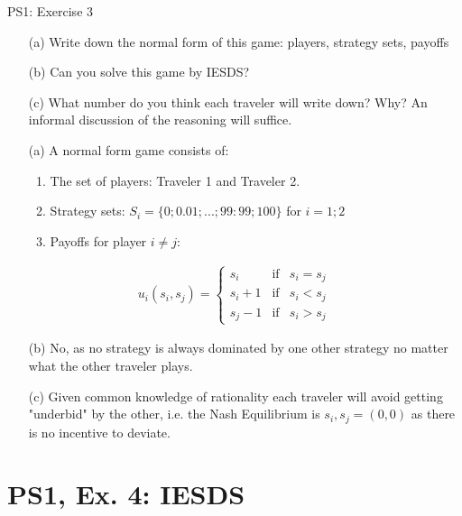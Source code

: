 \begin{frame}{PS1: Exercise 3}
\begin{multicols}{2}
  \begin{itemize}
    \item[(a)] Write down the normal form of this game: players, strategy sets, payoffs
  \item[(b)] Can you solve this game by IESDS?
  \item[(c)] What number do you think each traveler will write down? Why? An informal
  discussion of the reasoning will suffice.
  \end{itemize}
\vfill\null
\columnbreak
\begin{itemize}
  \item[(a)] A normal form game consists of:
    \begin{enumerate}
      \item The set of players: Traveler 1 and Traveler 2.
      \item Strategy sets: $S_i = \{0; 0.01; ... ; 99:99; 100\}$ for $i = 1; 2$
      \item Payoffs for player $i\neq j$:
    \end{enumerate}
\end{itemize}
\begin{align*}
  u_i(s_i,s_j)=
  \left\{ \begin{array}{ccl}
  s_i   & \mbox{if} & s_i=s_j \\
  s_i+1 & \mbox{if} & s_i<s_j \\
  s_j-1 & \mbox{if} & s_i>s_j
  \end{array}\right.
\end{align*}
\begin{itemize}
  \item[(b)] No, as no strategy is always dominated by one other strategy no matter what the other traveler plays.
  \item[(c)] Given common knowledge of rationality each traveler will avoid getting "underbid" by the other, i.e. the Nash Equilibrium is $s_i,s_j=(0,0)$ as there is no incentive to deviate.
\end{itemize}
\vfill\null
\end{multicols}
\end{frame}


\section{PS1, Ex. 4: IESDS}

